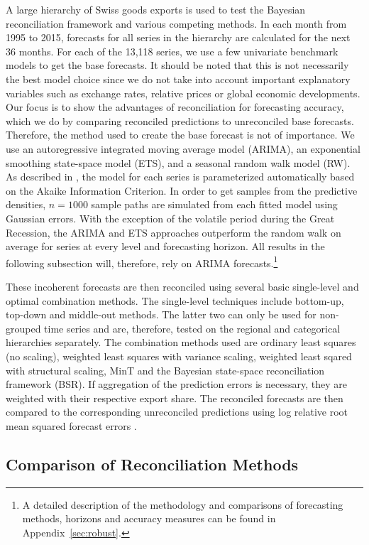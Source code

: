 \documentclass[a4paper,fleqn,11pt]{article}
\begin{document}
A large hierarchy of Swiss goods exports is used to test the Bayesian reconciliation framework and various competing methods. In each month from 1995 to 2015, forecasts for all series in the hierarchy are calculated for the next 36 months. For each of the 13,118 series, we use a few univariate benchmark models to get the base forecasts. It should be noted that this is not necessarily the best model choice since we do not take into account important explanatory variables such as exchange rates, relative prices or global economic developments. Our focus is to show the advantages of reconciliation for forecasting accuracy, which we do by comparing reconciled predictions to unreconciled base forecasts. Therefore, the method used to create the base forecast is not of importance. We use an autoregressive integrated moving average model (ARIMA), an exponential smoothing state-space model (ETS), and a seasonal random walk model (RW). As described in \cite{Hyndman2008}, the model for each series is parameterized automatically based on the Akaike Information Criterion. In order to get samples from the predictive densities, $n = 1000$ sample paths are simulated from each fitted model using Gaussian errors. With the exception of the volatile period during the Great Recession, the ARIMA and ETS approaches outperform the random walk on average for series at every level and forecasting horizon. All results in the following subsection will, therefore, rely on ARIMA forecasts.\footnote{A detailed description of the methodology and comparisons of forecasting methods, horizons and accuracy measures can be found in Appendix~\ref{sec:robust}.}

These incoherent forecasts are then reconciled using several basic single-level and optimal combination methods. The single-level techniques include bottom-up, top-down and middle-out methods. The latter two can only be used for non-grouped time series and are, therefore, tested on the regional and categorical hierarchies separately. The combination methods used are ordinary least squares (no scaling), weighted least squares with variance scaling, weighted least sqared with structural scaling, MinT and the Bayesian state-space reconciliation framework (BSR). If aggregation of the prediction errors is necessary, they are weighted with their respective export share. The reconciled forecasts are then compared to the corresponding unreconciled predictions using log relative root mean squared forecast errors \citep{Hyndman2006}.


\subsection{Comparison of Reconciliation Methods}\label{sec:comp}
\end{document}
